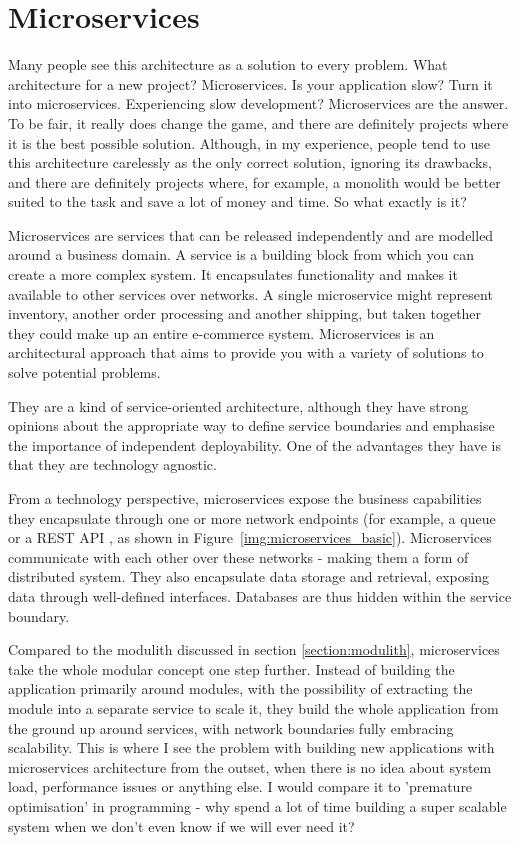 \section{Microservices}
\label{section:microservices}
Many people see this architecture as a solution to every problem. What architecture for a new project? Microservices. Is your application slow? Turn it into microservices. Experiencing slow development? Microservices are the answer. To be fair, it really does change the game, and there are definitely projects where it is the best possible solution. Although, in my experience, people tend to use this architecture carelessly as the only correct solution, ignoring its drawbacks, and there are definitely projects where, for example, a monolith would be better suited to the task and save a lot of money and time. So what exactly is it?

Microservices are services that can be released independently and are modelled around a business domain. A service is a building block from which you can create a more complex system. It encapsulates functionality and makes it available to other services over networks. A single microservice might represent inventory, another order processing and another shipping, but taken together they could make up an entire e-commerce system. Microservices is an architectural approach that aims to provide you with a variety of solutions to solve potential problems. \cite{BUILDING_MS_WHAT_ARE}

They are a kind of service-oriented architecture, although they have strong opinions about the appropriate way to define service boundaries and emphasise the importance of independent deployability. One of the advantages they have is that they are technology agnostic. \cite{BUILDING_MS_WHAT_ARE}

From a technology perspective, microservices expose the business capabilities they encapsulate through one or more network endpoints \cite{MON_TO_MS_MICROSERVICE} (for example, a queue or a REST API \cite{BUILDING_MS_WHAT_ARE}, as shown in Figure~\ref{img:microservices_basic}). Microservices communicate with each other over these networks - making them a form of distributed system. They also encapsulate data storage and retrieval, exposing data through well-defined interfaces. Databases are thus hidden within the service boundary. \cite{MON_TO_MS_MICROSERVICE}

Compared to the modulith discussed in section \ref{section:modulith}, microservices take the whole modular concept one step further. Instead of building the application primarily around modules, with the possibility of extracting the module into a separate service to scale it, they build the whole application from the ground up around services, with network boundaries fully embracing scalability. This is where I see the problem with building new applications with microservices architecture from the outset, when there is no idea about system load, performance issues or anything else. I would compare it to 'premature optimisation' in programming - why spend a lot of time building a super scalable system when we don't even know if we will ever need it?

